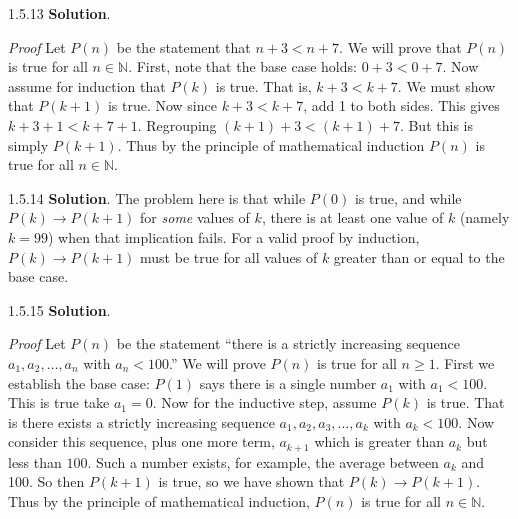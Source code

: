 \documentclass[11pt,]{book}
\makeatletter
\theoremstyle{ptxplainnotitle}
\theoremstyle{ptxplaintitle}
\renewcommand*{\proofname}{Proof}
\renewenvironment{proof}[1][\proofname]{\par
  \pushQED{\qed}%
  \normalfont \topsep6\p@\@plus6\p@\relax
  \trivlist
  \item\relax
    {\itshape
    #1\@addpunct{.}}\hspace\labelsep\ignorespaces
}{%
  \popQED\endtrivlist\@endpefalse
}
\theoremstyle{ptxdefinitionnotitle}
\theoremstyle{ptxdefinitiontitle}
\theoremstyle{ptxdefinitionnotitle}
\theoremstyle{ptxdefinitiontitle}
\theoremstyle{ptxdefinitionnotitle}
\theoremstyle{ptxdefinitiontitle}
\theoremstyle{ptxdefinitiontitlenonumber}
\theoremstyle{ptxdefinitiontitlenonumber}
\numberwithin{equation}{chapter}
\newcommand{\N}{\mathbb N}
\newcommand{\imp}{\rightarrow}
\newcommand{\lt}{<}
\makeatother
\begin{document}
\begin{divisionexercise}{1.5.13}
\textbf{Solution}.\quad%
\begin{proof}\hypertarget{proof-12}{}
\hypertarget{p-617}{}%
Let \(P(n)\) be the statement that \(n + 3 \lt  n + 7\). We will prove that \(P(n)\) is true for all \(n \in \N\). First, note that the base case holds: \(0+3 \lt  0+7\). Now assume for induction that \(P(k)\) is true. That is, \(k+3 \lt  k+7\). We must show that \(P(k+1)\) is true. Now since \(k + 3 \lt  k + 7\), add 1 to both sides. This gives \(k + 3 + 1 \lt  k + 7 + 1\). Regrouping \((k+1) + 3 \lt  (k+1) + 7\). But this is simply \(P(k+1)\). Thus by the principle of mathematical induction \(P(n)\) is true for all \(n \in \N\).%
\end{proof}
\end{divisionexercise}%
\begin{divisionexercise}{1.5.14}
\textbf{Solution}.\quad%
\hypertarget{p-620}{}%
The problem here is that while \(P(0)\) is true, and while \(P(k) \imp P(k+1)\) for \emph{some} values of \(k\), there is at least one value of \(k\) (namely \(k = 99\)) when that implication fails. For a valid proof by induction, \(P(k) \imp P(k+1)\) must be true for all values of \(k\) greater than or equal to the base case.%
\end{divisionexercise}%
\begin{divisionexercise}{1.5.15}
\textbf{Solution}.\quad%
\begin{proof}\hypertarget{proof-14}{}
\hypertarget{p-622}{}%
Let \(P(n)\) be the statement ``there is a strictly increasing sequence \(a_1, a_2, \ldots, a_n\) with \(a_n \lt  100\).'' We will prove \(P(n)\) is true for all \(n \ge 1\). First we establish the base case: \(P(1)\) says there is a single number \(a_1\) with \(a_1 \lt  100\). This is true \textendash{} take \(a_1 = 0\). Now for the inductive step, assume \(P(k)\) is true. That is there exists a strictly increasing sequence \(a_1, a_2, a_3, \ldots, a_k\) with \(a_k \lt  100\). Now consider this sequence, plus one more term, \(a_{k+1}\) which is greater than \(a_k\) but less than \(100\). Such a number exists, for example, the average between \(a_k\) and 100. So then \(P(k+1)\) is true, so we have shown that \(P(k) \imp P(k+1)\). Thus by the principle of mathematical induction, \(P(n)\) is true for all \(n \in \N\).%
\end{proof}
\end{divisionexercise}%
\end{document}
